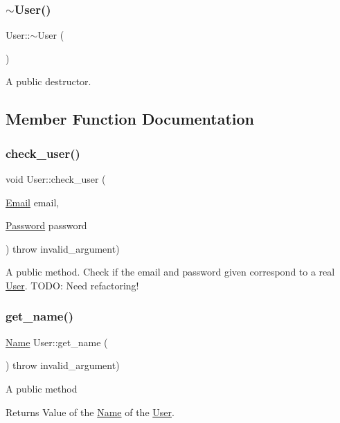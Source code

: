 \subsubsection{\texorpdfstring{$\sim$\+User()}{~User()}}
{\footnotesize\ttfamily User\+::$\sim$\+User (\begin{DoxyParamCaption}{ }\end{DoxyParamCaption})}

A public destructor. 

\subsection{Member Function Documentation}
\mbox{\label{class_user_ad633c8904f8955905275932b19f283cf}} 
\subsubsection{\texorpdfstring{check\+\_\+user()}{check\_user()}}
{\footnotesize\ttfamily void User\+::check\+\_\+user (\begin{DoxyParamCaption}\item[{\hyperlink{class_email}{Email}}]{email,  }\item[{\hyperlink{class_password}{Password}}]{password }\end{DoxyParamCaption}) throw  invalid\+\_\+argument) }

A public method. Check if the email and password given correspond to a real \hyperlink{class_user}{User}. T\+O\+DO\+: Need refactoring! \mbox{\label{class_user_af992bab722091aafb2024d4eacf80c59}} 
\subsubsection{\texorpdfstring{get\+\_\+name()}{get\_name()}}
{\footnotesize\ttfamily \hyperlink{class_name}{Name} User\+::get\+\_\+name (\begin{DoxyParamCaption}{ }\end{DoxyParamCaption}) throw  invalid\+\_\+argument) }

A public method \begin{DoxyReturn}{Returns}
Value of the \hyperlink{class_name}{Name} of the \hyperlink{class_user}{User}. 
\end{DoxyReturn}
\mbox{\label{class_user_a0ecc593131bdfb1f17364ffe033d7094}} 
